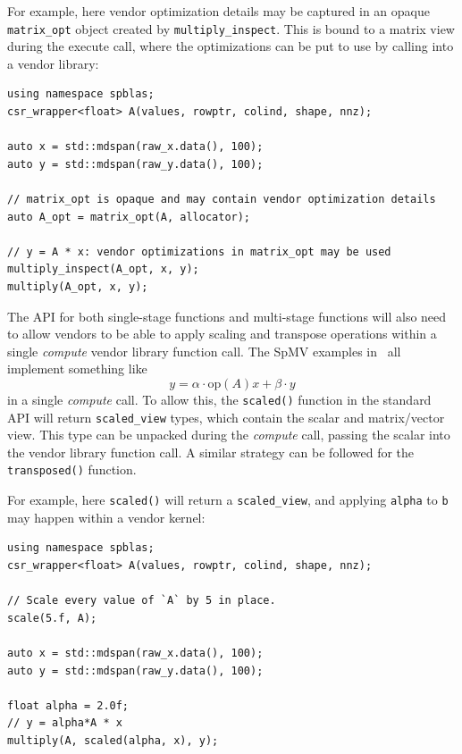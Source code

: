\documentclass[manuscript,review]{acmart}
\begin{document}
For example, here vendor optimization details may be captured in an opaque \texttt{matrix\_opt} object created by \texttt{multiply\_inspect}. This is bound to a matrix view during the execute call, where the optimizations can be put to use by calling into a vendor library:

\begin{verbatim}
using namespace spblas;
csr_wrapper<float> A(values, rowptr, colind, shape, nnz);

auto x = std::mdspan(raw_x.data(), 100);
auto y = std::mdspan(raw_y.data(), 100);

// matrix_opt is opaque and may contain vendor optimization details
auto A_opt = matrix_opt(A, allocator);

// y = A * x: vendor optimizations in matrix_opt may be used
multiply_inspect(A_opt, x, y);
multiply(A_opt, x, y); 
\end{verbatim}


The API for both single-stage functions and multi-stage functions will also need to allow vendors to be able to apply scaling and transpose operations within a single \textit{compute}  vendor library function call. The SpMV examples in~ all implement something like \begin{equation*}y = \alpha\cdot\text{op}\left(A\right) x + \beta\cdot y\end{equation*} in a single \textit{compute} call. To allow this, the \texttt{scaled()} function in the standard API will return \texttt{scaled\_view} types, which contain the scalar and matrix/vector view. This type can be unpacked during the \textit{compute} call, passing the scalar into the vendor library function call. A similar strategy can be followed for the \texttt{transposed()} function.

For example, here \texttt{scaled()} will return a \texttt{scaled\_view}, and applying \texttt{alpha} to \texttt{b} may happen within a vendor kernel:
\begin{verbatim}
using namespace spblas;
csr_wrapper<float> A(values, rowptr, colind, shape, nnz);

// Scale every value of `A` by 5 in place.
scale(5.f, A);

auto x = std::mdspan(raw_x.data(), 100);
auto y = std::mdspan(raw_y.data(), 100);

float alpha = 2.0f;
// y = alpha*A * x
multiply(A, scaled(alpha, x), y);
\end{verbatim}

\fi
\end{document}
